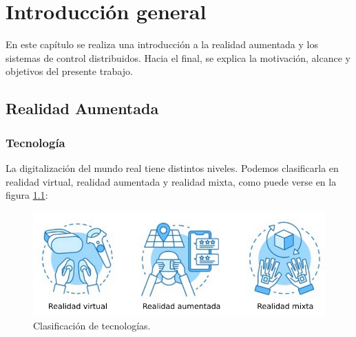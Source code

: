 
\chapter{Introducción general} %

\label{Chapter1} %
\label{IntroGeneral}


\newcommand{\keyword}[1]{\textbf{#1}}
\newcommand{\tabhead}[1]{\textbf{#1}}
\newcommand{\code}[1]{\texttt{#1}}
\newcommand{\file}[1]{\texttt{\bfseries#1}}
\newcommand{\option}[1]{\texttt{\itshape#1}}
\newcommand{\grados}{$^{\circ}$}



En este capítulo se realiza una introducción a la realidad aumentada y los sistemas de control distribuidos. Hacia el final, se explica la motivación, alcance y objetivos del presente trabajo.

\section{Realidad Aumentada}
\subsection{Tecnología}

La digitalización del mundo real tiene distintos niveles. Podemos clasificarla en realidad virtual, realidad aumentada y realidad mixta, como puede verse en la figura \ref{fig:realidades}:

\begin{figure}[htpb]
	\centering
	\includegraphics[width=\textwidth]{./Figures/realidades.png}
	\caption{Clasificación de tecnologías\protect\footnotemark.}
	\label{fig:realidades}
\end{figure}

